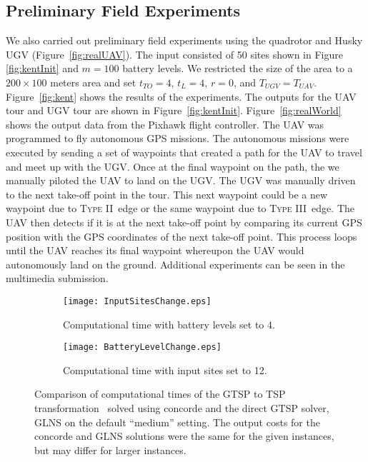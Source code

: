 \documentclass[letterpaper,10pt,conference]{ieeeconf}
\newcommand{\typetwo}{\textsc{Type II\ }}
\newcommand{\typethree}{\textsc{Type III\ }}
\begin{document}

\subsection{Preliminary Field Experiments}
We also carried out preliminary field experiments using the quadrotor and Husky UGV (Figure~\ref{fig:realUAV}). The input consisted of 50 sites shown in Figure \ref{fig:kentInit} and $m = 100$ battery levels. We restricted the size of the area to a $200 \times 100$ meters area and set $t_{TO} = 4$, $t_{L} = 4$, $r = 0$, and $T_{UGV} = T_{UAV}$. Figure~\ref{fig:kent} shows the results of the experiments. The outputs for the UAV tour and UGV tour are shown in Figure~\ref{fig:kentInit}. Figure~\ref{fig:realWorld} shows the output data from the Pixhawk flight controller. The UAV was programmed to fly autonomous GPS missions. The autonomous missions were executed by sending a set of waypoints that created a path for the UAV to travel and meet up with the UGV. Once at the final waypoint on the path, the we manually piloted the UAV to land on the UGV. The UGV was manually driven to the next take-off point in the tour. This next waypoint could be a new waypoint due to \typetwo edge or the same waypoint due to \typethree edge. The UAV then detects if it is at the next take-off point by comparing its current GPS position with the GPS coordinates of the next take-off point. This process loops until the UAV reaches its final waypoint whereupon the UAV would autonomously land on the ground. Additional experiments can be seen in the multimedia submission.

\begin{figure}[ht]
\centering
\begin{subfigure}[b]{0.46\columnwidth}
\texttt{[image: InputSitesChange.eps]}
\caption{Computational time with battery levels set to 4.}
\label{fig:sitechange}
\end{subfigure}
\begin{subfigure}[b]{0.45\columnwidth}
\texttt{[image: BatteryLevelChange.eps]}
\caption{Computational time with input sites set to 12.}
\label{fig:levelchange}
\end{subfigure}
\caption{Comparison of computational times of the GTSP to TSP transformation~\cite{noon1993efficient} solved using concorde and the direct GTSP solver, GLNS \cite{Smith2016GLNS} on the default ``medium'' setting. The output costs for the concorde and GLNS solutions were the same for the given instances, but may differ for larger instances.}
\label{fig:timecomparison}
\end{figure}
\end{document}
